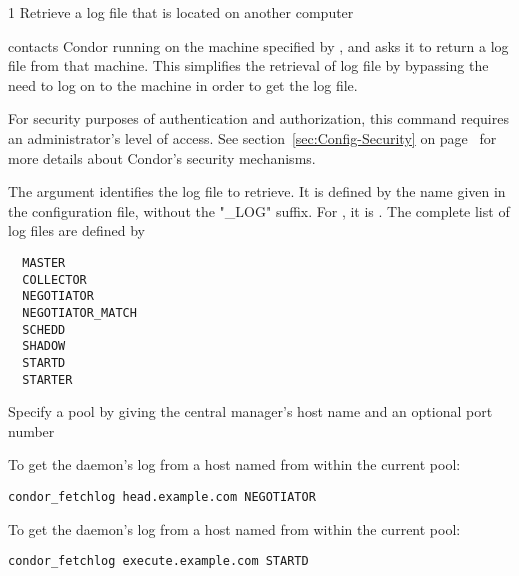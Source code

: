 \begin{ManPage}{\label{man-condor-fetchlog}}{1}
{Retrieve a log file that is located on another computer}

\Synopsis 
{}
\ToolArgsBase

\ToolArgsAffect
{}


\Description 

 contacts Condor running on the machine specified
by , and asks it
to return a log file from that machine. This simplifies the
retrieval of log file by bypassing the need 
to log on to the machine in order to get the log file. 

For security purposes of authentication and authorization, 
this command requires an administrator's level of access.
See section~\ref{sec:Config-Security} 
on page~\pageref{sec:Config-Security} for more details about Condor's
security mechanisms.

The  argument identifies the log file to retrieve.
It is defined by the name
given in the configuration file, without the "\_LOG" suffix.
For , it is .
The complete list of log files are defined by
\begin{verbatim}
  MASTER
  COLLECTOR
  NEGOTIATOR
  NEGOTIATOR_MATCH
  SCHEDD
  SHADOW
  STARTD
  STARTER
\end{verbatim}

\begin{Options}
    \ToolArgsBaseDesc
    {Specify a pool by giving the central manager's host name
    and an optional port number}
    \ToolArgsAffectDesc
\end{Options}

\Examples
To get the  daemon's log from a host named 
 from within the current pool:
\begin{verbatim}
condor_fetchlog head.example.com NEGOTIATOR
\end{verbatim}

To get the  daemon's log from a host named
 from within the current pool:
\begin{verbatim}
condor_fetchlog execute.example.com STARTD
\end{verbatim}


\end{ManPage}
